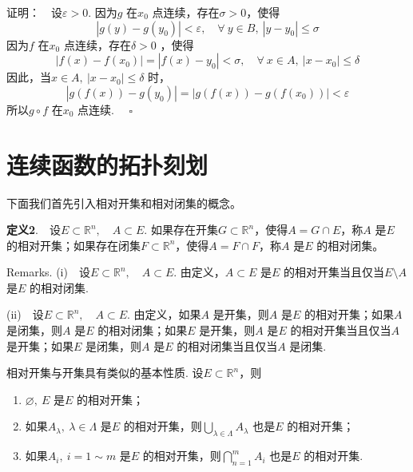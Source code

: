 \documentclass{article}
\begin{document}
证明：\ \ 设\(\varepsilon > 0\). 因为\(g\) 在\(x_0\) 点连续，存在\(\sigma > 0\)，使得
\begin{equation*}
    | g(y) - g(y_0) |< \varepsilon ,\quad \forall\ y \in B,\ | y - y_0 | \le \sigma
\end{equation*}
因为\(f\) 在\(x_0\) 点连续，存在\(\delta > 0\) ，使得
\begin{equation*}
    | f(x) - f(x_0) |= | f(x) - y_0 |< \sigma ,\quad \forall\ x \in A,\ | x - x_0 | \le \delta
\end{equation*}
因此，当\(x \in A,\ | x - x_0 | \le \delta  \) 时，
\begin{equation*}
    | g \left( f(x) \right) - g(y_0)  |= | g(f(x) ) - g(f(x_0) )| < \varepsilon
\end{equation*}
所以\(g \circ f\) 在\(x_0\) 点连续. \(\quad \square\)

\newpage

\section{连续函数的拓扑刻划}
下面我们首先引入相对开集和相对闭集的概念。

\vspace{10pt}

\textbf{定义2}.\ \ 设\(E \subset \mathbb{R}^n,\quad A \subset E\). 如果存在开集\(G \subset \mathbb{R}^n\)，使得\(A = G \cap E\)，称\(A\) 是\(E\) 的相对开集；如果存在闭集\(F \subset \mathbb{R}^n\)，使得\(A = F \cap F\)，称\(A\) 是\(E\) 的相对闭集。

\vspace{10pt}

Remarks.\newline
(i)\ \ 设\(E \subset \mathbb{R}^n,\quad A \subset E\). 由定义，\(A \subset E\) 是\(E\) 的相对开集当且仅当\(E\setminus A\) 是\(E\) 的相对闭集.

(ii)\ \ 设\(E \subset \mathbb{R}^n,\quad A \subset E\). 由定义，如果\(A\) 是开集，则\(A\) 是\(E\) 的相对开集；如果\(A\) 是闭集，则\(A\) 是\(E\) 的相对闭集；如果\(E\) 是开集，则\(A\) 是\(E\) 的相对开集当且仅当\(A\) 是开集；如果\(E\) 是闭集，则\(A\) 是\(E\) 的相对闭集当且仅当\(A\) 是闭集.

\newpage

相对开集与开集具有类似的基本性质. 设\(E \subset \mathbb{R}^n\)，则
\begin{enumerate}
    \item \(\varnothing ,\ E\) 是\(E\) 的相对开集；
    \item 如果\(A_{\lambda },\ \lambda \in \Lambda \) 是\(E\) 的相对开集，则\(\bigcup_{\lambda \in \Lambda } A_{\lambda } \) 也是\(E\) 的相对开集；
    \item 如果\(A_i,\ i = 1 \sim m \) 是\(E\) 的相对开集，则\(\bigcap_{n=1}^{m} A_i \) 也是\(E\) 的相对开集.
\end{enumerate}
\end{document}
